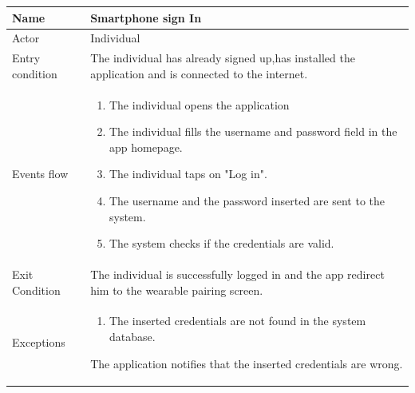 \begin{table}[p]
\centering
\begin{tabular}{|l|p{11cm}|}
    \hline
    Name & Smartphone sign In
    \\ \hline
    Actor & Individual
    \\ \hline 
    Entry condition & The individual has already signed up,has installed the application and is connected to the internet.
    \\ \hline
    Events flow &
    \begin{enumerate}
    \item The individual opens the application
    \item The individual fills the username and password field in the app homepage.
    \item The individual taps on "Log in".
    \item The username and the password inserted are sent to the system.
    \item The system checks if the credentials are valid.
    \end{enumerate}
     \\ \hline
     Exit Condition & The individual is successfully logged in and the app redirect him to the wearable pairing screen.
     \\
    \hline
    Exceptions &
     \begin{enumerate}
    \item The inserted credentials are not found in the system database.  
    \end{enumerate}
   The application notifies that the inserted credentials are wrong.
      \\
    \hline
\end{tabular}
\end{table}

